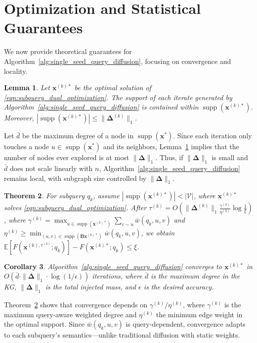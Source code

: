 \documentclass{article} %
\newtheorem{theorem}{Theorem}
\newtheorem{corollary}[theorem]{Corollary}
\newtheorem{lemma}[theorem]{Lemma}
\begin{document}
\section{Optimization and Statistical Guarantees}\label{sec:guarantees}
We now provide theoretical guarantees for Algorithm~\ref{alg:single_seed_query_diffusion}, focusing on convergence and locality.
\begin{lemma}\label{lem:locality}
Let $\mathbf{x}^{(k)*}$ be the optimal solution of \eqref{eqn:subquery_dual_optimization}. The support of each iterate generated by Algorithm~\ref{alg:single_seed_query_diffusion} is contained within $\operatorname{supp}(\mathbf{x}^{(k)*})$. Moreover, $ |\operatorname{supp}(\mathbf{x}^{(k)*})| \leq \|\boldsymbol{\Delta}^{(k)}\|_1$.
\end{lemma}
%
Let $\bar{d}$ be the maximum degree of a node in $\operatorname{supp}(\mathbf{x}^*)$. Since each iteration only touches a node $u \in \operatorname{supp}(\mathbf{x}^*)$ and its neighbors, Lemma~\ref{lem:locality} implies that the number of nodes ever explored is at most $\|\boldsymbol{\Delta}\|_1$. Thus, if $\|\boldsymbol{\Delta}\|_1$ is small and $\bar{d}$ does not scale linearly with $n$, Algorithm~\ref{alg:single_seed_query_diffusion} remains local, with subgraph size controlled by $\|\boldsymbol{\Delta}\|_1$.
\begin{theorem}\label{lem:complexity}
For subquery $q_k$, assume $|\operatorname{supp}(\mathbf{x}^{(k)*})| < |\mathcal{V}|$, where $\mathbf{x}^{(k)*}$ solves \eqref{eqn:subquery_dual_optimization}. After $\tau^{(k)} = O\!\left(\|\boldsymbol{\Delta}^{(k)}\|_1 \tfrac{\gamma^{(k)}}{\eta^{(k)}} \log \tfrac{1}{\xi}\right)$, where $\gamma^{(k)} = \max_{u \in \operatorname{supp}(\mathbf{x}^{(k)*})} \sum_{v \sim u} \bar{w}(q_k, u, v)$ and $\eta^{(k)} \geq \min_{(u,v) \in \operatorname{supp}(\mathbf{B}\mathbf{x}^{(k)*})} \bar{w}(q_k, u, v)$, we obtain $\mathbb{E}\!\left[F\!\left(\mathbf{x}^{(k),\tau^{(k)}}; q_k\right)\right] - F\!\left(\mathbf{x}^{(k)*};q_k\right) \leq \xi$.
\end{theorem}
%
\begin{corollary}\label{thm:convergence_rag}
Algorithm~\ref{alg:single_seed_query_diffusion} converges to $\mathbf{x}^{(k)*}$ in $O(\bar{d} \cdot \|\boldsymbol{\Delta}\|_1 \cdot \log(1/\epsilon))$ iterations, where $\bar{d}$ is the maximum degree in the KG, $\|\boldsymbol{\Delta}\|_1$ is the total injected mass, and $\epsilon$ is the desired accuracy.
\end{corollary}
Theorem~\ref{lem:complexity} shows that convergence depends on $\gamma^{(k)}/\eta^{(k)}$, where $\gamma^{(k)}$ is the maximum query-aware weighted degree and $\eta^{(k)}$ the minimum edge weight in the optimal support. Since $\bar{w}(q_k, u, v)$ is query-dependent, convergence adapts to each subquery’s semantics—unlike traditional diffusion with static weights. 
\end{document}
